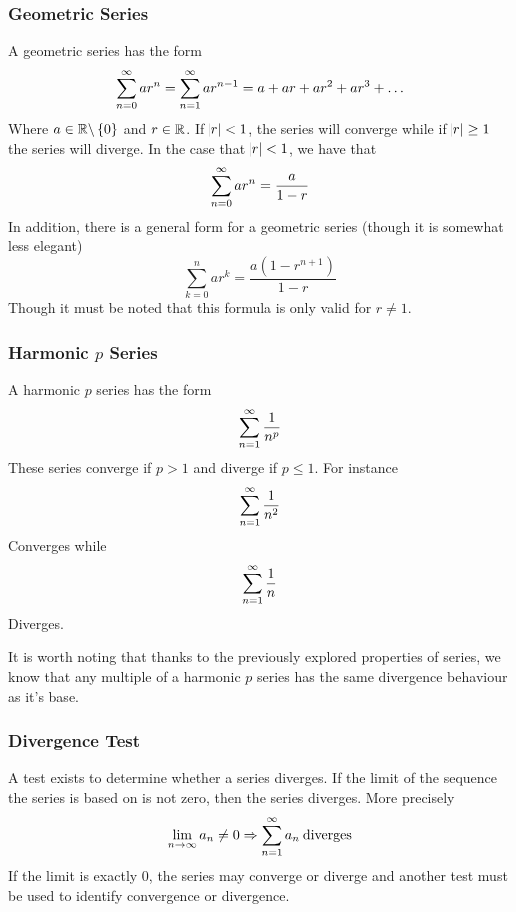 \documentclass[12pt]{report}
\begin{document}
\begin{flushleft}
\subsubsection*{Geometric Series}
A geometric series has the form
\[\sumninf[0] ar^n = \sumninf ar^{n - 1} = a + ar + ar^2 + ar^3 + \ldots\]
Where \(a\in\R\backslash\set{0}\) and \(r\in\R\). If \(\abs{r} < 1\), the
series will converge while if \(\abs{r} \geq 1\) the series will diverge.
In the case that \(\abs{r} < 1\), we have that
\[\sumninf[0]ar^n = \frac{a}{1 - r}\]
In addition, there is a general form for a geometric series (though it is 
somewhat less elegant)
\[\sum_{k = 0}^n ar^k = \frac{a\left(1 - r^{n + 1}\right)}{1 - r}\]
Though it must be noted that this formula is only valid for \(r\neq1\).

\subsubsection*{Harmonic \(p\) Series}
A harmonic \(p\) series has the form
\[\sumninf\frac{1}{n^p}\]
These series converge if \(p > 1\) and diverge if \(p \leq 1\). For instance
\[\sumninf \frac{1}{n^2}\]
Converges while
\[\sumninf \frac{1}{n}\]
Diverges. \par
It is worth noting that thanks to the previously explored properties of series,
we know that any multiple of a harmonic \(p\) series has the same divergence
behaviour as it's base.

\subsubsection*{Divergence Test}
A test exists to determine whether a series diverges. If the limit of the 
sequence the series is based on is not zero, then the series diverges. More
precisely
\[\limit_{n\rightarrow\infty} a_n \neq 0 \Rightarrow \sumninf a_n 
\:\mathrm{diverges}\]
If the limit is exactly \(0\), the series may converge or diverge and another
test must be used to identify convergence or divergence.


\end{flushleft}
\end{document}
